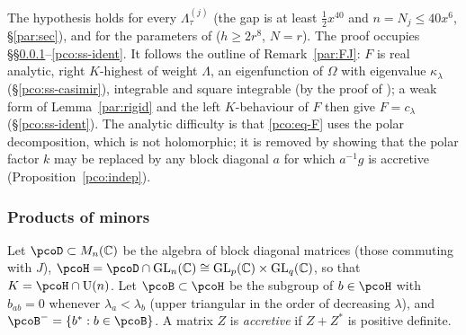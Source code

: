 \documentclass[10pt]{amsart}
\theoremstyle{definition}
\theoremstyle{remark}
\newcommand{\C}{\mathbb C}
\providecommand{\auU}{\mathrm U}
\begin{document}
The hypothesis holds for every $\Lambda^{(j)}_\tau$ (the gap is at least $\frac12x^{40}$ and
$n=N_j\le40x^6$, \S\ref{par:sec}), and for the parameters of {\cite[\S5.1]{P51}}
($h\ge2r^8$, $N=r$). The proof occupies \S\S\ref{pco:ss-minors}--\ref{pco:ss-ident}. It follows
the outline of Remark~\ref{par:FJ}: $F$ is real analytic, right $K$-highest of weight $\Lambda$,
an eigenfunction of $\Omega$ with eigenvalue $\kappa_\lambda$ (\S\ref{pco:ss-casimir}),
integrable and square integrable (by the proof of {\cite[Theorem~5.6]{P51}}); a weak form of
Lemma~\ref{par:rigid} and the left $K$-behaviour of $F$ then give $F=c_\lambda$
(\S\ref{pco:ss-ident}). The analytic difficulty is that \eqref{pco:eq-F} uses the polar
decomposition, which is not holomorphic; it is removed by showing that the polar factor $k$ may be
replaced by any block diagonal $a$ for which $a^{-1}g$ is accretive (Proposition~\ref{pco:indep}).

\subsubsection{Products of minors}\label{pco:ss-minors}
Let $\pcoD\subset M_n(\C)$ be the algebra of block diagonal matrices (those commuting with $J$),
$\pcoH=\pcoD\cap\mathrm{GL}_n(\C)\cong\mathrm{GL}_p(\C)\times\mathrm{GL}_q(\C)$, so that $K=\pcoH\cap
\auU(n)$. Let $\pcoB\subset\pcoH$ be the subgroup of $b\in\pcoH$ with $b_{ab}=0$ whenever
$\lambda_a<\lambda_b$ (upper triangular in the order of decreasing $\lambda$), and $\pcoB^-=
\{b^*:b\in\pcoB\}$. A matrix $Z$ is \emph{accretive} if $Z+Z^*$ is positive definite.
\end{document}
